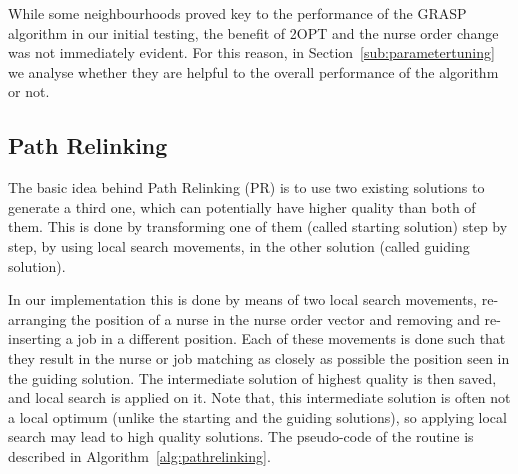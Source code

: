 \documentclass[a4paper,11pt,authoryear]{elsarticle}
\begin{document}
\noindent While some neighbourhoods proved key to the performance of the GRASP algorithm in our initial testing, the benefit of 2OPT and the nurse order change was not immediately evident. For this reason, in Section~\ref{sub:parametertuning} we analyse whether they are helpful to the overall performance of the algorithm or not.

\subsection{Path Relinking}
\label{sub:pathrelinking}
\noindent The basic idea behind Path Relinking (PR) \citep{laguna1999,resende2016} is to use two existing solutions to generate a third one, which can potentially have higher quality than both of them.
This is done by transforming one of them (called starting solution) step by step, by using local search movements, in the other solution (called guiding solution).

In our implementation this is done by means of two local search movements, re-arranging the position of a nurse in the nurse order vector and removing and re-inserting a job in a different position. Each of these movements is done such that they result in the nurse or job matching as closely as possible the position seen in the guiding solution. The intermediate solution of highest quality is then saved, and local search is applied on it. Note that, this intermediate solution is often not a local optimum (unlike the starting and the guiding solutions), so applying local search may lead to high quality solutions. The pseudo-code of the routine is described in Algorithm~\ref{alg:pathrelinking}.
\end{document}
